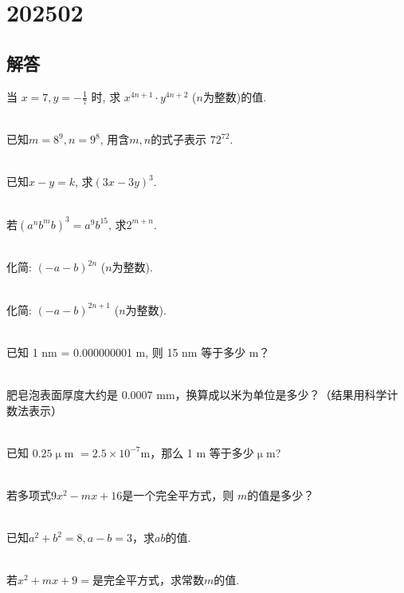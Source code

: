 \section{202502}

\subsection{解答}
\item{
    当 $ x=7, y=-\frac{1}{7}$ 时, 求 $x^{4n+1}\cdot y^{4n+2}$ ($n$为整数)的值.
} 
\\ \\
\item{
    已知$ m=8^9, n=9^8 $, 用含$m, n$的式子表示 $72^{72}$.
} 
\\ \\
\item{
    已知$x-y=k$, 求$(3x-3y)^3.$
} 
\\ \\
\item{
    若$(a^nb^mb)^3 = a^9 b^{15}$, 求$2^{m+n}$.
}
\\ \\
\item{
    化简: $(-a-b)^{2n}$ ($n$为整数).
}
\\ \\
\item{
    化简: $(-a-b)^{2n+1}$ ($n$为整数).
}
\\ \\
\item{
    已知 1 nm = 0.000000001 m, 则 15 nm 等于多少 m？
}
\\ \\
\item{
    肥皂泡表面厚度大约是 0.0007 mm，换算成以米为单位是多少？（结果用科学计数法表示）
}
\\ \\
\item{
    已知 $0.25 \upmu$m $ = 2.5\times 10^{-7}$m，那么 1 m 等于多少$\upmu$m?
}
\\ \\
\item{
    若多项式$ 9x^2 - mx+16$是一个完全平方式，则 $m$的值是多少？
}
\\ \\
\item{
    已知$a^2+b^2=8, a-b=3$，求$ab$的值.
}
\\ \\
\item{
    若$x^2+mx+9=$是完全平方式，求常数$m$的值.
}
\\ \\
